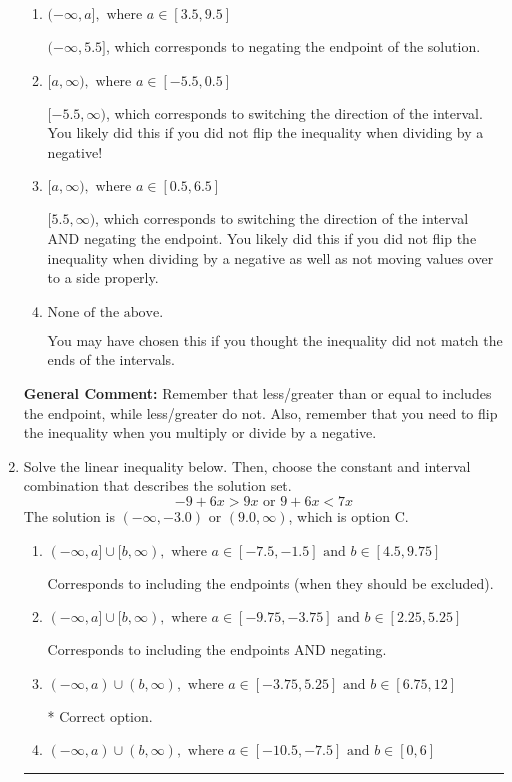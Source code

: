 \documentclass{extbook}[14pt]
\newcommand{\litem}[1]{\item #1

\rule{\textwidth}{0.4pt}}
\begin{document}
\begin{enumerate}
{\begin{enumerate}[label=\Alph*.]
* $(-\infty, -5.5]$, which is the correct option.
\item \( (-\infty, a], \text{ where } a \in [3.5, 9.5] \)

 $(-\infty, 5.5]$, which corresponds to negating the endpoint of the solution.
\item \( [a, \infty), \text{ where } a \in [-5.5, 0.5] \)

 $[-5.5, \infty)$, which corresponds to switching the direction of the interval. You likely did this if you did not flip the inequality when dividing by a negative!
\item \( [a, \infty), \text{ where } a \in [0.5, 6.5] \)

 $[5.5, \infty)$, which corresponds to switching the direction of the interval AND negating the endpoint. You likely did this if you did not flip the inequality when dividing by a negative as well as not moving values over to a side properly.
\item \( \text{None of the above}. \)

You may have chosen this if you thought the inequality did not match the ends of the intervals.
\end{enumerate}

\textbf{General Comment:} Remember that less/greater than or equal to includes the endpoint, while less/greater do not. Also, remember that you need to flip the inequality when you multiply or divide by a negative.
}
\litem{
Solve the linear inequality below. Then, choose the constant and interval combination that describes the solution set.
\[ -9 + 6 x > 9 x \text{ or } 9 + 6 x < 7 x \]The solution is \( (-\infty, -3.0) \text{ or } (9.0, \infty) \), which is option C.\begin{enumerate}[label=\Alph*.]
\item \( (-\infty, a] \cup [b, \infty), \text{ where } a \in [-7.5, -1.5] \text{ and } b \in [4.5, 9.75] \)

Corresponds to including the endpoints (when they should be excluded).
\item \( (-\infty, a] \cup [b, \infty), \text{ where } a \in [-9.75, -3.75] \text{ and } b \in [2.25, 5.25] \)

Corresponds to including the endpoints AND negating.
\item \( (-\infty, a) \cup (b, \infty), \text{ where } a \in [-3.75, 5.25] \text{ and } b \in [6.75, 12] \)

 * Correct option.
\item \( (-\infty, a) \cup (b, \infty), \text{ where } a \in [-10.5, -7.5] \text{ and } b \in [0, 6] \)


\end{enumerate}}
\end{enumerate}
\end{document}
